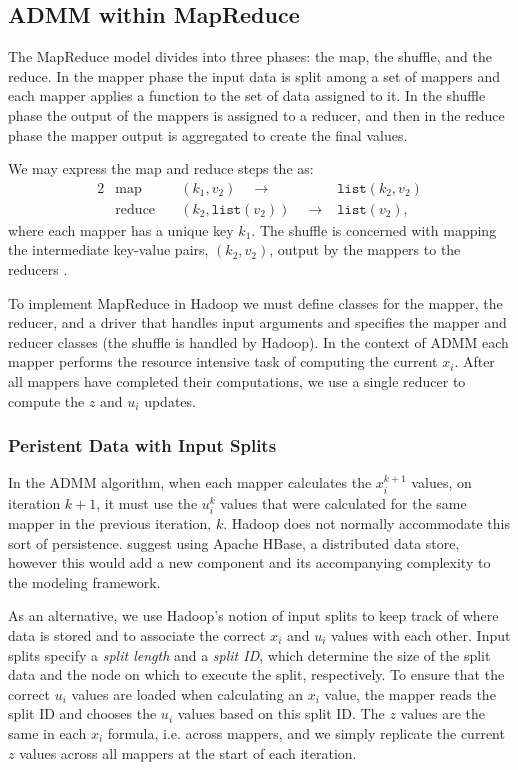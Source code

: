\documentclass[10pt, conference, compsocconf]{IEEEtran}
\begin{document}
\subsection{ADMM within MapReduce}
The MapReduce model divides into three phases: the map, the shuffle, and the reduce.  In the mapper phase the input data is split among a set of mappers and each mapper applies a function to the set of data assigned to it.  In the shuffle phase the output of the mappers is assigned to a reducer, and then in the reduce phase the mapper output is aggregated to create the final values.

We may express the map and reduce steps the as:
\begin{alignat*}{2}
&\text{map}\quad &(k_1,v_2)\quad\rightarrow &\texttt{list}(k_2,v_2)\\
&\text{reduce}\quad &(k_2,\texttt{list}(v_2))\quad\rightarrow &\texttt{list}(v_2),
\end{alignat*}
where each mapper has a unique key $k_1$.  The shuffle is concerned with mapping the intermediate key-value pairs, $(k_2,v_2)$, output by the mappers to the reducers \cite{dean2004}.

To implement MapReduce in Hadoop we must define classes for the mapper, the reducer, and a driver that handles input arguments and specifies the mapper and reducer classes (the shuffle is handled by Hadoop).  In the context of ADMM each mapper performs the resource intensive task of computing the current $x_i$.  After all mappers have completed their computations, we use a single reducer to compute the $z$ and $u_i$ updates.

\subsubsection{Peristent Data with Input Splits}
In the ADMM algorithm, when each mapper calculates the $x_i^{k+1}$ values, on iteration $k+1$, it must use the $u_i^k$ values that were calculated for the same mapper in the previous iteration, $k$.  Hadoop does not normally accommodate this sort of persistence.  \cite{boyd} suggest using Apache HBase, a distributed data store, however this would add a new component and its accompanying complexity to the modeling framework.

As an alternative, we use Hadoop's notion of input splits to keep track of where data is stored and to associate the correct $x_i$ and $u_i$ values with each other.  Input splits specify a \emph{split length} and a \emph{split ID}, which determine the size of the split data and the node on which to execute the split, respectively.  To ensure that the correct $u_i$ values are loaded when calculating an $x_i$ value, the mapper reads the split ID and chooses the $u_i$ values based on this split ID.  The $z$ values are the same in each $x_i$ formula, i.e. across mappers, and we simply replicate the current $z$ values across all mappers at the start of each iteration.
\end{document}
